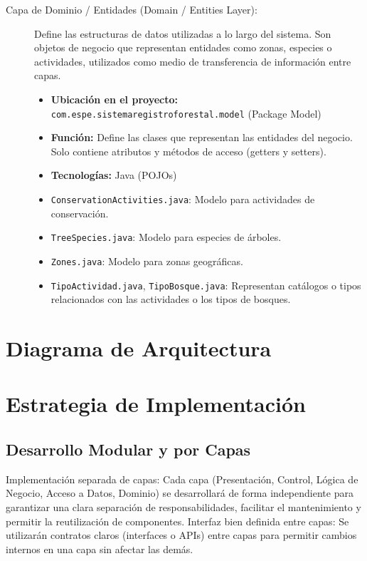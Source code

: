 \begin{description}
\begin{itemize}
    \end{itemize}
    \item[Capa de Dominio / Entidades (Domain / Entities Layer):] Define las estructuras de datos utilizadas a lo largo del sistema. Son objetos de negocio que representan entidades como zonas, especies o actividades, utilizados como medio de transferencia de información entre capas.
    \begin{itemize}
        \item \textbf{Ubicación en el proyecto:} \texttt{com.espe.sistemaregistroforestal.model} (Package Model)
        \item \textbf{Función:} Define las clases que representan las entidades del negocio. Solo contiene atributos y métodos de acceso (getters y setters).
        \item \textbf{Tecnologías:} Java (POJOs)
        \item \texttt{ConservationActivities.java}: Modelo para actividades de conservación.
        \item \texttt{TreeSpecies.java}: Modelo para especies de árboles.
        \item \texttt{Zones.java}: Modelo para zonas geográficas.
        \item \texttt{TipoActividad.java}, \texttt{TipoBosque.java}: Representan catálogos o tipos relacionados con las actividades o los tipos de bosques.
    \end{itemize}
\end{description}

\section{Diagrama de Arquitectura}

\section{Estrategia de Implementación}
\subsection{Desarrollo Modular y por Capas}
Implementación separada de capas: Cada capa (Presentación, Control, Lógica de Negocio, Acceso a Datos, Dominio) se desarrollará de forma independiente para garantizar una clara separación de responsabilidades, facilitar el mantenimiento y permitir la reutilización de componentes.
Interfaz bien definida entre capas: Se utilizarán contratos claros (interfaces o APIs) entre capas para permitir cambios internos en una capa sin afectar las demás.

